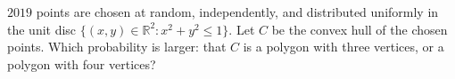 $2019$ points are chosen at random, independently, and distributed uniformly in the unit disc $\{(x,y)\in\mathbb R^2: x^2+y^2\le 1\}$. Let $C$ be the convex hull of the chosen points. Which probability is larger: that $C$ is a polygon with three vertices, or a polygon with four vertices?

